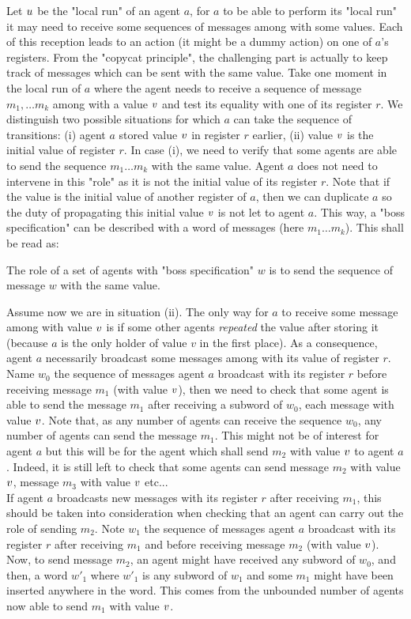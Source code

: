 Let $u$ be the "local run" of an agent $a$, for $a$ to be able to perform its "local run" it may need to receive some sequences of messages among with some values. Each of this reception leads to an action (it might be a dummy action) on one of $a$'s registers.
From the "copycat principle", the challenging part is actually to keep track of messages which can be sent with the same value. Take one moment in the local run of $a$ where the agent needs to receive a sequence of message $m_1, \dots m_k$ among with a value $v$ and test its equality with one of its register $r$. We distinguish two possible situations for which $a$ can take the sequence of transitions: (i) agent $a$ stored value $v$ in register $r$ earlier, (ii) value $v$ is the initial value of register $r$. In case (i), we need to verify that some agents are able to send the sequence $m_1 \dots m_k$ with the same value. Agent $a$ does not need to intervene in this "role" as it is not the initial value of its register $r$. Note that if the value is the initial value of another register of $a$, then we can duplicate $a$ so the duty of propagating this initial value $v$ is not let to agent $a$. This way, a "boss specification" can be described with a word of messages (here $m_1 \dots m_k$). This shall be read as:
\begin{center}
	The role of a set of agents with "boss specification" $w$ is to send the sequence of message $w$ with the same value.
\end{center}

Assume now we are in situation (ii). The only way for $a$ to receive some message among with value $v$ is if some other agents \emph{repeated} the value after storing it (because $a$ is the only holder of value $v$ in the first place). As a consequence, agent $a$ necessarily broadcast some messages among with its value of register $r$. Name $w_0$ the sequence of messages agent $a$ broadcast with its register $r$ before receiving message $m_1$ (with value $v$), then we need to check that some agent is able to send the message $m_1$ after receiving a subword of $w_0$, each message with value $v$. Note that, as any number of agents can receive the sequence $w_0$, any number of agents can send the message $m_1$. This might not be of interest for agent $a$ but this will be for the agent which shall send $m_2$ with value $v$ to agent $a$. Indeed, it is still left to check that some agents can send message $m_2$ with value $v$, message $m_3$ with value $v$ etc...\\
If agent $a$ broadcasts new messages with its register $r$ after receiving $m_1$, this should be taken into consideration when checking that an agent can carry out the role of sending $m_2$. Note $w_1$ the sequence of messages agent $a$ broadcast with its register $r$ after receiving $m_1$ and before receiving message $m_2$ (with value $v$). Now, to send message $m_2$, an agent might have received any subword of $w_0$, and then, a word $w'_1$ where $w'_1$ is any subword of $w_1$ and some $m_1$ might have been inserted anywhere in the word. This comes from the unbounded number of agents now able to send $m_1$ with value $v$.


